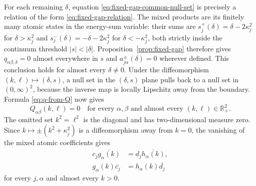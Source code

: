 \documentclass[11pt]{amsart}
\numberwithin{equation}{section}
\theoremstyle{remark}
\newcommand{\R}{\mathbb R}
\begin{document}
For each remaining $\delta$, equation
\eqref{eq:fixed-gap-common-null-set} is precisely a relation of the form
\eqref{eq:fixed-gap-relation}.  The mixed products are its finitely many
atomic states in the energy-sum variable: their sums are
$s_j^+(\delta)=\delta-2\kappa_j^2$ for $\delta>\kappa_j^2$ and
$s_j^-(\delta)=-\delta-2\kappa_j^2$ for $\delta<-\kappa_j^2$, both strictly
inside the continuum threshold $|s|<|\delta|$.  Proposition~\ref{prop:fixed-gap}
therefore gives $q_{\alpha\beta,\delta}=0$ almost everywhere in $s$ and
$a^\pm_{j\alpha}(\delta)=0$ wherever defined.  This conclusion holds for
almost every $\delta\ne0$.  Under the diffeomorphism
$(k,\ell)\mapsto(\delta,s)$, a null set in the $(\delta,s)$ plane pulls back
to a null set in $(0,\infty)^2$, because the inverse map is locally Lipschitz
away from the boundary.  Formula \eqref{eq:q-from-Q} now gives
\begin{equation}
 Q_{\alpha\beta}(k,\ell)=0
 \quad\text{for every $\alpha,\beta$ and almost every $(k,\ell)\in\R_+^2$}.
 \label{eq:ac-kernel-recovered}
\end{equation}
The omitted set $k^2=\ell^2$ is the diagonal and has two-dimensional measure
zero.  Since $k\mapsto\pm(k^2+\kappa_j^2)$ is a diffeomorphism away from
$k=0$, the vanishing of the mixed atomic coefficients gives
\begin{align}
 c_j\overline{g_\alpha(k)}
 &=d_j\overline{h_\alpha(k)},
 \label{eq:mixed-one}\\
 g_\alpha(k)\overline{c_j}
 &=h_\alpha(k)\overline{d_j}
 \label{eq:mixed-two}
\end{align}
for every $j,\alpha$ and almost every $k>0$.
\end{document}
